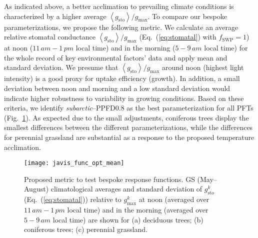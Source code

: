 \documentclass[bg, manuscript]{copernicus}
\begin{document}
As indicated above, a better acclimation to prevailing climate conditions is characterized by a higher average $\left<g_\mathrm{sto}\right>/g_\mathrm{max}$. To compare our bespoke parameterizations, we propose the following metric. We calculate an average relative stomatal conductance $\left<g_\mathrm{sto}\right>/g_\mathrm{max}$ (Eq.~(\ref{eq:stomatal}) with $f_\mathrm{SWP}=1$) at noon ($11\,\unit{am}-1\,\unit{pm}$ local time) and in the morning ($5-9\,\unit{am}$ local time) for the whole record of key environmental factors' data and apply mean and standard deviation. We presume that $\left<g_\mathrm{sto}\right>/g_\mathrm{max}$ around noon (highest light intensity) is a good proxy for  uptake efficiency (growth). In addition, a small deviation between noon and morning and a low standard deviation would indicate higher robustness to variability in growing conditions. Based on these criteria, we identify \emph{subarctic}--PPFD0.8 as the best parameterization for all PFTs (Fig.~\ref{fig:javis_func_opt_mean}). As expected due to the small adjustments, coniferous trees display the smallest differences between the different parameterizations, while the differences for perennial grassland are substantial as a response to the proposed temperature acclimation.

\begin{figure}[t]
  \texttt{[image: javis\_func\_opt\_mean]}
  \caption{Proposed metric to test bespoke response functions. GS (May--August) climatological averages and standard deviation of $g_\mathrm{sto}^k$ (Eq.~(\ref{eq:stomatal})) relative to $g_\mathrm{max}^k$ at noon (averaged over $11\,\unit{am}-1\,\unit{pm}$ local time) and in the morning (averaged over $5-9\,\unit{am}$ local time) are shown for (a) deciduous trees; (b) coniferous trees; (c) perennial grassland. }
  \label{fig:javis_func_opt_mean}
\end{figure}
\end{document}
